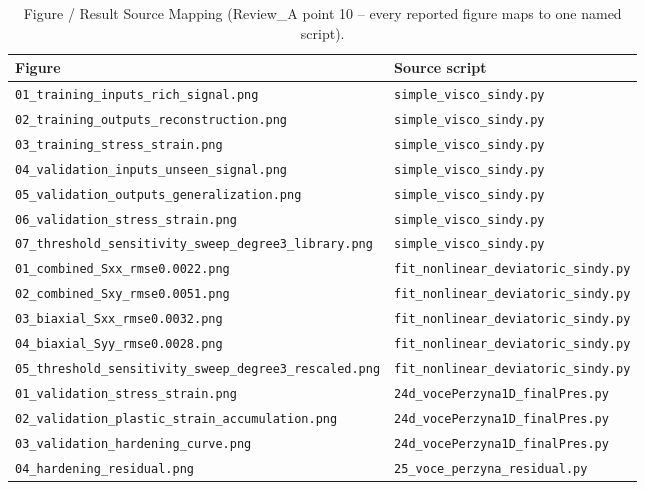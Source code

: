 \documentclass{article}
\begin{document}
\begin{table}[h]
\centering
\caption{Figure / Result Source Mapping (Review\_A point 10 -- every reported figure maps to one named script).}
\label{tab:figure_sources}
\small
\begin{tabular}{ll}
\toprule
Figure & Source script \\
\midrule
\texttt{01\_training\_inputs\_rich\_signal.png} & \texttt{simple\_visco\_sindy.py} \\
\texttt{02\_training\_outputs\_reconstruction.png} & \texttt{simple\_visco\_sindy.py} \\
\texttt{03\_training\_stress\_strain.png} & \texttt{simple\_visco\_sindy.py} \\
\texttt{04\_validation\_inputs\_unseen\_signal.png} & \texttt{simple\_visco\_sindy.py} \\
\texttt{05\_validation\_outputs\_generalization.png} & \texttt{simple\_visco\_sindy.py} \\
\texttt{06\_validation\_stress\_strain.png} & \texttt{simple\_visco\_sindy.py} \\
\texttt{07\_threshold\_sensitivity\_sweep\_degree3\_library.png} & \texttt{simple\_visco\_sindy.py} \\
\midrule
\texttt{01\_combined\_Sxx\_rmse0.0022.png} & \texttt{fit\_nonlinear\_deviatoric\_sindy.py} \\
\texttt{02\_combined\_Sxy\_rmse0.0051.png} & \texttt{fit\_nonlinear\_deviatoric\_sindy.py} \\
\texttt{03\_biaxial\_Sxx\_rmse0.0032.png} & \texttt{fit\_nonlinear\_deviatoric\_sindy.py} \\
\texttt{04\_biaxial\_Syy\_rmse0.0028.png} & \texttt{fit\_nonlinear\_deviatoric\_sindy.py} \\
\texttt{05\_threshold\_sensitivity\_sweep\_degree3\_rescaled.png} & \texttt{fit\_nonlinear\_deviatoric\_sindy.py} \\
\midrule
\texttt{01\_validation\_stress\_strain.png} & \texttt{24d\_vocePerzyna1D\_finalPres.py} \\
\texttt{02\_validation\_plastic\_strain\_accumulation.png} & \texttt{24d\_vocePerzyna1D\_finalPres.py} \\
\texttt{03\_validation\_hardening\_curve.png} & \texttt{24d\_vocePerzyna1D\_finalPres.py} \\
\texttt{04\_hardening\_residual.png} & \texttt{25\_voce\_perzyna\_residual.py} \\
\bottomrule
\end{tabular}
\end{table}
\end{document}
